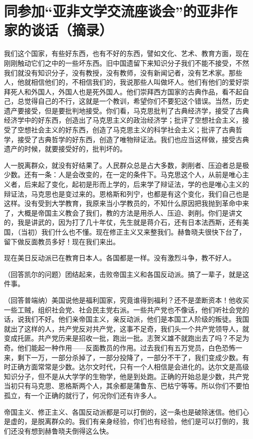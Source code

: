 \section[同参加“亚非文学交流座谈会”的亚非作家的谈话（摘录）（一九六四年十二月二十五日）]{同参加“亚非文学交流座谈会”的亚非作家的谈话（摘录）}


我们这个国家，有些好东西，也有不好的东西，譬如文化、艺术、教育方面，现在刚刚触动它们之中的一些坏东西。旧中国遗留下来知识分子我们不能不接受，不然我们就没有知识分子，没有教授，没有教师，没有新闻记者，没有艺术家。那些人，他就相信他们的，不相信我们的，我说那些人叫做坏人。他们有他们的爱好崇拜死人和外国人，外国人也是死外国人。他们崇拜西方国家的古典作品，看不起自己，总觉得自己的不行，这就是一个教训，希望你们不要犯这个错误。当然，历史遗产要接受，但是要批判地接受。你们看，马克思批判了古典经济学，接受了古典经济学中的好东西，创造出了马克思主义的政治经济学；批评了空想社会主义，接受了空想社会主义的好东西，创造了马克思主义的科学社会主义；批评了古典哲学，接受了古典哲学的好东西，创造了唯物辩证法。我们也应当这样做，接受古典遗产的时候，就要接受好的，批判坏的。

人一脱离群众，就没有好结果了。人民群众总是占大多数，剥削者、压迫者总是极少数。还有一条：人是会改变的，在一定的条件下。马克思这个人，从前是唯心主义者，后来起了变化，起初是形而上学的，后来学了辩证法，学的也是唯心主义的辩证法，马克思也是变过来的。恩格斯和列宁，也都是有这个变化，我们自己也是这样。没有受到大学教育，我原来当小学教员的，不知什么原因把我抛到革命中来了，大概是帝国主义教会了我们，教的方法是用杀人、压迫、剥削。你们是讲文的，我是讲武的，因为打了几十年仗，先生就是蒋介石，还有日本法西斯，还有美国，（当初）我们什么也不懂。现在修正主义又来整我们。赫鲁晓夫很快下台了，留下做反面教员多好！现在我们来出。

现在美日反动派已在教育日本人。各国都是一样。没有激烈斗争，教不好人。

（回答凯尔的问题）团结起来，击败帝国主义和各国反动派。搞了一辈子，就是这件事。

（回答普端纳）美国说他是福利国家，究竟谁得到福利？还不是垄断资本！他收买一些工贼，组织社会党、社会民主党右派。一些共产党也不像话，他们听社会党的话，说我们不好。他们亲帝国主义，亲反动派，他们是本国工人阶级的叛徒。我国就出了这样的人，共产党反对共产党，这事不足奇，我们头一个共产党领导人，就变成托匪。共产党历来是招收一批，跑出一批。志贺义雄不就跑出去了吗？不足为奇。他们能起一种作用——反面教员的作用。过去我们有五万党员，白色恐怖一来，剩下一万，一部分杀掉了，一部分投降了，一部分不干了，我们变成少数。有时正确方面常常是少数。达尔文时代，只有一个人相信是会进化的。达尔文是高级知识分子，但不是从大学学的生物学，他是到处跑。正确的开始总是少数，共产党当初只有马克思、恩格斯两个人，其余都是蒲鲁东、巴枯宁等等。所以你们不要怕孤立，有一个正确的就行了，何况你们还有许多人。

帝国主义、修正主义、各国反动派都是可以打倒的，这一条也是破除迷信。他们心是虚的，是脱离群众的。我们有亲身经验，你们也有经验，他们是可以打倒的，我们还没有想到赫鲁晓夫倒得这么快。



